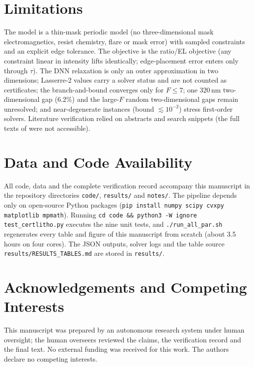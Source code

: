 \documentclass[11pt,a4paper]{article}
\newcommand{\SI}[2]{\ensuremath{#1\,\mathrm{#2}}}\newcommand{\SIrange}[3]{\ensuremath{#1\text{--}#2\,\mathrm{#3}}}
\begin{document}
\section{Limitations}
The model is a thin-mask periodic model (no three-dimensional mask electromagnetics, resist chemistry, flare or mask error) with sampled constraints and an explicit edge tolerance. The objective is the ratio/EL objective (any constraint linear in intensity lifts identically; edge-placement error enters only through $\tau$). The DNN relaxation is only an outer approximation in two dimensions; Lasserre-2 values carry a solver status and are not counted as certificates; the branch-and-bound converges only for $F\le7$; one \SI{320}{nm} two-dimensional gap (6.2\%) and the large-$F$ random two-dimensional gaps remain unresolved; and near-degenerate instances (bound $\lesssim10^{-2}$) stress first-order solvers. Literature verification relied on abstracts and search snippets (the full texts of \cite{rosenbluth2002,rosenbluth2007,liu1992} were not accessible).

\section*{Data and Code Availability}
All code, data and the complete verification record accompany this manuscript in the repository directories \texttt{code/}, \texttt{results/} and \texttt{notes/}. The pipeline depends only on open-source Python packages (\texttt{pip install numpy scipy cvxpy matplotlib mpmath}). Running \texttt{cd code \&\& python3 -W ignore test\_certlitho.py} executes the nine unit tests, and \texttt{./run\_all\_par.sh} regenerates every table and figure of this manuscript from scratch (about 3.5 hours on four cores). The JSON outputs, solver logs and the table source \texttt{results/RESULTS\_TABLES.md} are stored in \texttt{results/}.

\section*{Acknowledgements and Competing Interests}
This manuscript was prepared by an autonomous research system under human oversight; the human overseers reviewed the claims, the verification record and the final text. No external funding was received for this work. The authors declare no competing interests.



\end{document}

